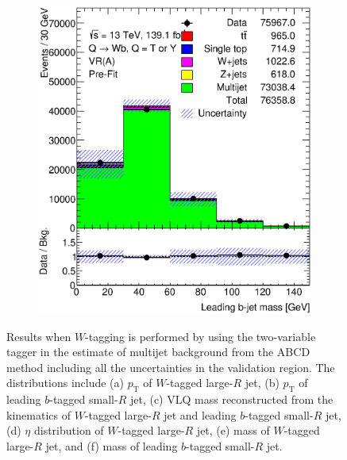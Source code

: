 \begin{figure}[hbt!]
\begin{subfigure}{.35\textwidth}
		\caption{}
		\label{fig:results:taggers:ljet_m}
	\end{subfigure}\hspace{0.6cm}
	\begin{subfigure}{.35\textwidth}
		\centering
		\includegraphics[width=\linewidth,height=\textheight,keepaspectratio]{VR_B_jet_m.eps}
		\caption{}
		\label{fig:results:taggers:jet_m}
	\end{subfigure}
	\caption{Results when $W$-tagging is performed by using the two-variable tagger in the estimate of multijet background from the ABCD method including all the uncertainties in the validation region. The distributions include (a) $p_{\text{T}}$ of $W$-tagged large-$R$ jet, (b) $p_{\text{T}}$ of leading $b$-tagged small-$R$ jet, (c) VLQ mass reconstructed from the kinematics of $W$-tagged large-$R$ jet and leading $b$-tagged small-$R$ jet, (d) $\eta$ distribution of $W$-tagged large-$R$ jet, (e) mass of $W$-tagged large-$R$ jet, and (f) mass of leading $b$-tagged small-$R$ jet.}
	\label{fig:results:taggers}
\end{figure}


